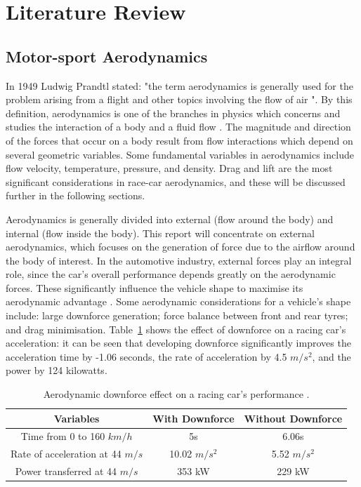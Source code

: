 \section{Literature Review}

\subsection{Motor-sport Aerodynamics}
In 1949 Ludwig Prandtl stated: "the term aerodynamics is generally used for the problem arising from a flight and other topics involving the flow of air \cite{Anderson2010FundamentalsAerodynamics}". By this definition, aerodynamics is one of the branches in physics which concerns and studies the interaction of a body and a fluid flow \cite{Scibor-Rylski1984RoadAerodynamics}. The magnitude and direction of the forces that occur on a body result from flow interactions which depend on several geometric variables. Some fundamental variables in aerodynamics include flow velocity, temperature, pressure, and density. Drag and lift are the most significant considerations in race-car aerodynamics, and these will be discussed further in the following sections.

\noindent Aerodynamics is generally divided into external (flow around the body) and internal (flow inside the body). This report will concentrate on external aerodynamics, which focuses on the generation of force due to the airflow around the body of interest. In the automotive industry, external forces play an integral role, since the car's overall performance depends greatly on the aerodynamic forces. These significantly influence the vehicle shape to maximise its aerodynamic advantage \cite{Scibor-Rylski1984RoadAerodynamics}. Some aerodynamic considerations for a vehicle's shape include: large downforce generation; force balance between front and rear tyres; and drag minimisation. Table~\ref{Table1} shows the effect of downforce on a racing car's acceleration: it can be seen that developing downforce significantly improves the acceleration time by -1.06 seconds, the rate of acceleration by 4.5 $m/s^2$, and the power by 124 kilowatts. 

\begin{table}[!ht]
\caption{\label{Table1} Aerodynamic downforce effect on a racing car's performance \cite{Scibor-Rylski1984RoadAerodynamics}.}
\vspace{-5mm}
\begin{center}
 \begin{tabular}{||c| c| c ||} 
 \hline
 Variables & With Downforce & Without Downforce \\ [0.5ex] 
 \hline\hline
 Time from 0 to 160 $km/h$ & 5s & 6.06s \\ 
 \hline
 Rate of acceleration at 44 $m/s$ & 10.02 $m/s^{2}$ & 5.52 $m/s^2$ \\
 \hline
 Power transferred at 44 $m/s$ & 353 kW & 229 kW  \\
 \hline
\end{tabular}
\end{center}
\end{table}

